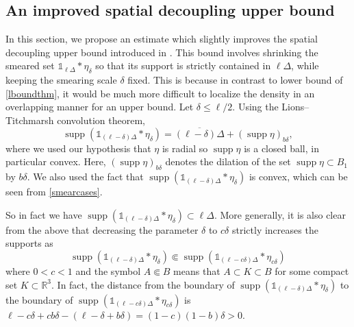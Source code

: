 \documentclass[final,onefignum,onetabnum,reqno]{amsart}
\theoremstyle{remark}
\renewcommand{\le}{\leqslant}
\newcommand{\ol}[1]{\overline{#1}}
\DeclareMathOperator{\supp}{supp}
\newcommand{\RR}{\mathbb{R}}
\newcommand{\iden}{\mathbb{1}} %
\newcommand{\tetra}{\mathbb{\Delta}} %
\begin{document}
\subsection{An improved spatial decoupling upper bound}\label{impdecoupsec}
In this section, we propose an estimate which slightly improves the spatial decoupling upper bound introduced in \cite{lewin2020local}.
This bound involves shrinking the smeared set $\iden_{\ell \tetra}*\eta_\delta$ so that its support is strictly contained in $\ell \tetra$, while keeping the smearing scale $\delta$ fixed. This is because in contrast to lower bound of \cref{lboundthm}, it would be much more difficult to localize the density in an overlapping manner for an upper bound.
Let $\delta\le\ell/2$. 
Using the Lions--Titchmarsh convolution theorem,
$$
\supp(\iden_{(\ell-\delta)\tetra} * \eta_\delta)=\ol{(\ell-\delta)\tetra} + (\supp\eta)_{b\delta},
$$
where we used our hypothesis that $\eta$ is radial so $\supp\eta$ is a closed ball, in particular convex. Here, $(\supp\eta)_{b\delta}$ denotes the dilation of the set $\supp\eta\subset B_1$ by $b\delta$. 
We also used the fact that $\supp(\iden_{(\ell-\delta)\tetra} * \eta_\delta)$ is convex, which can be seen from \cref{smearcases}.

So in fact we have $\supp(\iden_{(\ell-\delta)\tetra} * \eta_\delta)\subset \ell \tetra$. 
More generally, it is also clear from the above that decreasing the parameter $\delta$ to $c\delta$ strictly increases the supports as
\begin{equation}\label{suppinc}
\supp(\iden_{(\ell-\delta)\tetra} * \eta_\delta)\Subset\supp(\iden_{(\ell-c\delta)\tetra} * \eta_{c\delta})
\end{equation}
where $0<c<1$ and the symbol $A\Subset B$ means that $A\subset K\subset B$ for some compact set $K\subset\RR^3$. In fact, the distance from the boundary of $\supp(\iden_{(\ell-\delta)\tetra} * \eta_\delta)$ to the boundary of $\supp(\iden_{(\ell-c\delta)\tetra} * \eta_{c\delta})$ is $\ell-c\delta + cb\delta - (\ell -\delta+b\delta)=(1-c)(1-b)\delta>0$.
\end{document}
